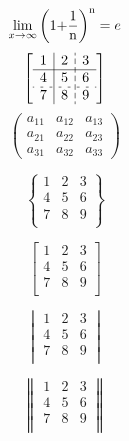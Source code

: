 \documentclass{book} %
\begin{document}
\[\mathop {\lim }\limits_{x \to \infty } {\left( {{\rm{1 + }}\frac{{\rm{1}}}{{\rm{n}}}} \right)^{\rm{n}}} = e\]
$$\left[\begin{array}{c|l;{4pt/2pt}r}
1&2&3\\
\hline
4&5&6\\
\hdashline[2pt/4pt]
7&8&9\\
\end{array}\right]$$
\[\left( {\begin{array}{*{20}{c}}
	{{a_{11}}}&{{a_{12}}}&{{a_{13}}}\\
	{{a_{21}}}&{{a_{22}}}&{{a_{23}}}\\
	{{a_{31}}}&{{a_{32}}}&{{a_{33}}}
	\end{array}} \right)\]

$$\begin{Bmatrix}
1&2&3\\
4&5&6\\
7&8&9\\
\end{Bmatrix}$$

$$\begin{bmatrix}
1&2&3\\
4&5&6\\
7&8&9\\
\end{bmatrix}$$

$$\begin{vmatrix}
1&2&3\\
4&5&6\\
7&8&9\\
\end{vmatrix}$$

$$\begin{Vmatrix}
1&2&3\\
4&5&6\\
7&8&9\\
\end{Vmatrix}$$
\end{document}
